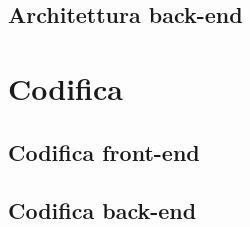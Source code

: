 \subsection{Architettura back-end}

\section{Codifica}\label{sec:codifica-requisiti}

\subsection{Codifica front-end}

\subsection{Codifica back-end}